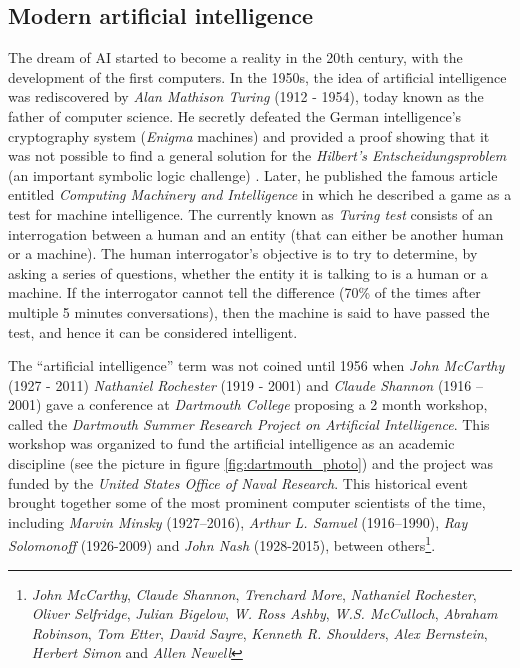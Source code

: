 \subsection{Modern artificial intelligence}
The dream of AI started to become a reality in the 20th century, with the development of the first computers. In the 1950s, the idea of artificial intelligence was rediscovered by \textit{Alan Mathison Turing} (1912 - 1954), today known as the father of computer science. He secretly defeated the German intelligence's cryptography system (\textit{Enigma} machines) \autocite{Hodges:2000} and provided a proof showing that it was not possible to find a general solution for the \textit{Hilbert's Entscheidungsproblem} (an important symbolic logic challenge) \autocite{turing1936}. Later, he published the famous article entitled \textit{Computing Machinery and Intelligence} \autocite{turing1950} in which he described a game as a test for machine intelligence. The currently known as \textit{Turing test} consists of an interrogation between a human and an entity (that can either be another human or a machine). The human interrogator's objective is to try to determine, by asking a series of questions, whether the entity it is talking to is a human or a machine. If the interrogator cannot tell the difference (70\% of the times after multiple 5 minutes conversations), then the machine is said to have passed the test, and hence it can be considered intelligent.


The ``artificial intelligence'' term was not coined until 1956 when \textit{John McCarthy} (1927 - 2011) \textit{Nathaniel Rochester} (1919 - 2001) and \textit{Claude Shannon} (1916 – 2001) gave a conference at \textit{Dartmouth College} proposing a 2 month workshop, called the \textit{Dartmouth Summer Research Project on Artificial Intelligence}. This workshop was organized to fund the artificial intelligence as an academic discipline (see the picture in figure \ref{fig:dartmouth_photo}) and the project was funded by the \textit{United States Office of Naval Research}. This historical event brought together some of the most prominent computer scientists of the time, including \textit{Marvin Minsky} (1927–2016), \textit{Arthur L. Samuel} (1916–1990), \textit{Ray Solomonoff} (1926-2009) and  \textit{John Nash} (1928-2015), between others\footnote{\textit{John McCarthy}, \textit{Claude Shannon}, \textit{Trenchard More}, \textit{Nathaniel Rochester}, \textit{Oliver Selfridge}, \textit{Julian Bigelow}, \textit{W. Ross Ashby}, \textit{W.S. McCulloch}, \textit{Abraham Robinson}, \textit{Tom Etter},  \textit{David Sayre}, \textit{Kenneth R. Shoulders}, \textit{Alex Bernstein}, \textit{Herbert Simon} and \textit{Allen Newell}}.

